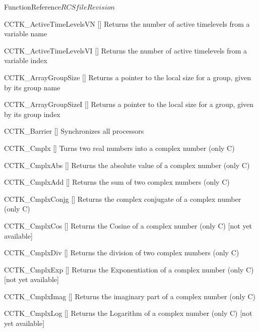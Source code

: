 \begin{cactuspart}{FunctionReference}{$RCSfile$}{$Revision$}
\begin{Lentry}
\item[CCTK\_ActiveTimeLevelsVN]
  [\pageref{CCTK-ActiveTimeLevels}]
  Returns the number of active timelevels from a variable name

\item[CCTK\_ActiveTimeLevelsVI]
  [\pageref{CCTK-ActiveTimeLevels}]
  Returns the number of active timelevels from a variable index

\item[CCTK\_ArrayGroupSize]
  [\pageref{CCTK-ArrayGroupSize}]
  Returns a pointer to the local size for a group, given by its group name

\item[CCTK\_ArrayGroupSizeI]
  [\pageref{CCTK-ArrayGroupSizeI}]
  Returns a pointer to the local size for a group, given by its group index

\item[CCTK\_Barrier]
  [\pageref{CCTK-Barrier}]
  Synchronizes all processors

\item[CCTK\_Cmplx]
  [\pageref{CCTK-Cmplx}]
  Turns two real numbers into a complex number (only C)

\item[CCTK\_CmplxAbs]
  [\pageref{CCTK-CmplxAbs}]
  Returns the absolute value of a complex number (only C)

\item[CCTK\_CmplxAdd]
  [\pageref{CCTK-CmplxAdd}]
  Returns the sum of two complex numbers (only C)

\item[CCTK\_CmplxConjg]
  [\pageref{CCTK-CmplxConjg}]
  Returns the complex conjugate of a complex number (only C)

\item[CCTK\_CmplxCos]
  [\pageref{CCTK-CmplxCos}]
  Returns the Cosine of a complex number (only C) [not yet available]

\item[CCTK\_CmplxDiv]
  [\pageref{CCTK-CmplxDiv}]
  Returns the division of two complex numbers (only C)

\item[CCTK\_CmplxExp]
  [\pageref{CCTK-CmplxExp}]
  Returns the Exponentiation of a complex number (only C) [not yet available]

\item[CCTK\_CmplxImag]
  [\pageref{CCTK-CmplxImag}]
  Returns the imaginary part of a complex number (only C)

\item[CCTK\_CmplxLog]
  [\pageref{CCTK-CmplxLog}]
  Returns the Logarithm of a complex number (only C) [not yet available]


\end{Lentry}
\end{cactuspart}
